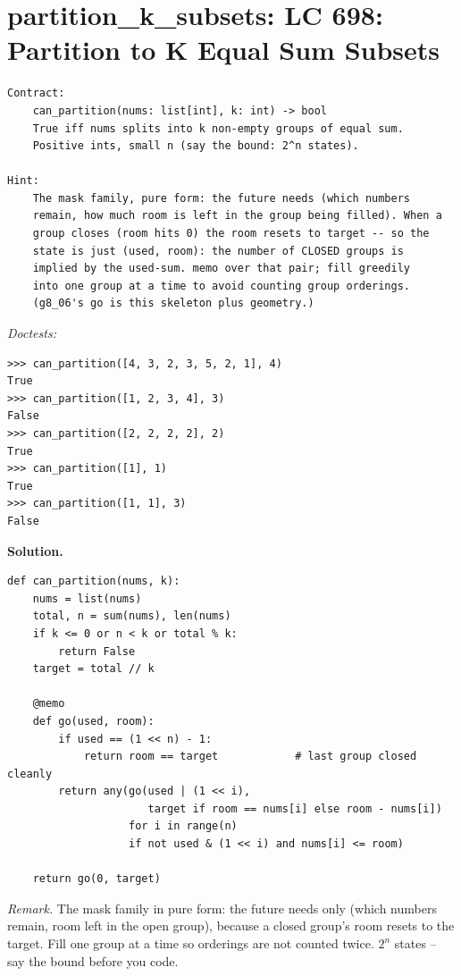 \documentclass[11pt,letterpaper]{book}
\begin{document}
\section{partition\_k\_subsets: LC 698: Partition to K Equal Sum Subsets}
\begin{lstlisting}[style=spec]
Contract:
    can_partition(nums: list[int], k: int) -> bool
    True iff nums splits into k non-empty groups of equal sum.
    Positive ints, small n (say the bound: 2^n states).

Hint:
    The mask family, pure form: the future needs (which numbers
    remain, how much room is left in the group being filled). When a
    group closes (room hits 0) the room resets to target -- so the
    state is just (used, room): the number of CLOSED groups is
    implied by the used-sum. memo over that pair; fill greedily
    into one group at a time to avoid counting group orderings.
    (g8_06's go is this skeleton plus geometry.)
\end{lstlisting}
\noindent\textit{Doctests:}
\begin{lstlisting}[style=spec]
>>> can_partition([4, 3, 2, 3, 5, 2, 1], 4)
True
>>> can_partition([1, 2, 3, 4], 3)
False
>>> can_partition([2, 2, 2, 2], 2)
True
>>> can_partition([1], 1)
True
>>> can_partition([1, 1], 3)
False
\end{lstlisting}
\noindent\textbf{Solution.}
\begin{lstlisting}[style=code]
def can_partition(nums, k):
    nums = list(nums)
    total, n = sum(nums), len(nums)
    if k <= 0 or n < k or total % k:
        return False
    target = total // k

    @memo
    def go(used, room):
        if used == (1 << n) - 1:
            return room == target            # last group closed cleanly
        return any(go(used | (1 << i),
                      target if room == nums[i] else room - nums[i])
                   for i in range(n)
                   if not used & (1 << i) and nums[i] <= room)

    return go(0, target)
\end{lstlisting}

\noindent\textit{Remark.} The mask family in pure form: the future needs only
(which numbers remain, room left in the open group), because a closed group's
room resets to the target. Fill one group at a time so orderings are not counted
twice. $2^n$ states -- say the bound before you code.
\end{document}
